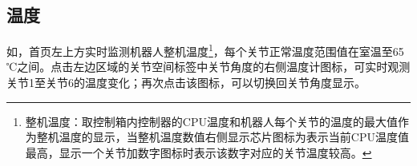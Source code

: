 \subsection{温度}
如，\LM 首页左上方实时监测机器人整机温度\footnote{整机温度：取控制箱内控制器的CPU温度和机器人每个关节的温度的最大值作为整机温度的显示，当整机温度数值右侧显示芯片图标为表示当前CPU温度值最高，显示一个关节加数字图标时表示该数字对应的关节温度较高。}，每个关节正常温度范围值在室温至65 ℃之间。点击左边区域的关节空间标签中关节角度的右侧温度计图标，可实时观测关节1至关节6的温度变化；再次点击该图标，可以切换回关节角度显示。


